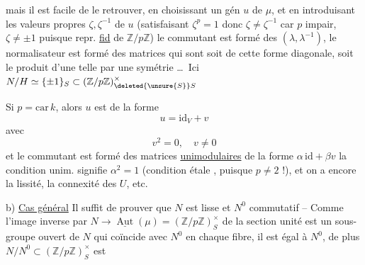 mais il est facile de le retrouver, en choisissant un gén $u$ de $\mu$, et en introduisant les valeurs propres $\zeta,\zeta^{-1}$ de $u$ (satisfaisant $\zeta^p=1$ donc $\zeta\ne\zeta^{-1}$ car $p$ impair, $\zeta\ne\pm1$  puisque repr. \uline{fid} de $\mathbb Z/p\mathbb Z$) le commutant  est formé des $(\lambda,\lambda^{-1})$, le normalisateur est formé des matrices qui sont soit de cette forme diagonale, soit le produit d'une telle par une symétrie \ldots\ Ici $N/H\simeq\{\pm1\}_S\subset(\mathbb Z/p\mathbb Z)^\times_{\deleted{\unsure{S}}S}$

Si $p=\mathrm{car}\,k$, alors $u$ est de la forme
\[
 u=\mathrm{id}_V+v
\]
avec 
\[
 v^2=0,\quad v\ne0
\]
et le commutant est formé des matrices \uline{unimodulaires} de la forme \deleted{\unsure{$\lambda$}} $\alpha\,\mathrm{id}+\beta v$   la condition unim. signifie $\alpha^2=1$ (condition étale , puisque $p\ne2$ !), et on a encore la lissité, la connexité des $U$, etc. 

b) \uline{Cas général} Il suffit de prouver que $N$ est lisse et $N^0$ commutatif -- Comme  l'image inverse par $N\longrightarrow\underline{\operatorname{Aut}}(\mu)=(\mathbb Z/p\mathbb Z)^\times_S$ de la section unité est un sous-groupe ouvert de $N$ qui coïncide avec $N^0$ en chaque fibre, il est égal à $N^0$, de plus $N/N^0\subset(\mathbb Z/p\mathbb Z)^\times_S$ est
